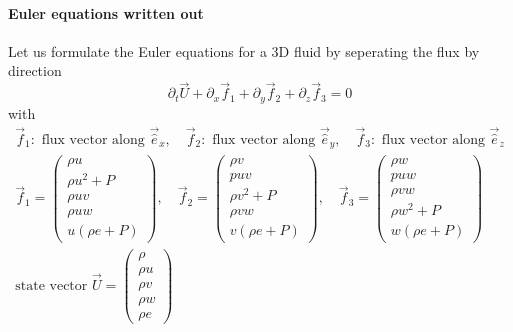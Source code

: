\paragraph*{Euler equations written out}
Let us formulate the \textcolor{blue1}{Euler equations for a 3D fluid} by seperating the flux by direction
\begin{equation}
    \partial_t \vec{U} + \partial_x \vec{f}_1 + \partial_y \vec{f}_2 + \partial_z \vec{f}_3 = 0
\end{equation}
with
\begin{equation}
    \begin{gathered}
        \vec{f}_1: \text{ flux vector along } \vec{\hat{e}}_x, \quad \vec{f}_2: \text{ flux vector along } \vec{\hat{e}}_y, \quad \vec{f}_3: \text{ flux vector along } \vec{\hat{e}}_z \\
        \vec{f}_1=\left(\begin{array}{c}
            \rho u \\
            \rho u^2+P \\
            \rho u v \\
            \rho u w \\
            u(\rho e+P)
            \end{array}\right), \quad \vec{f}_2=\left(\begin{array}{c}
            \rho v \\
            p u v \\
            \rho v^2+P \\
            \rho v w \\
            v(\rho e+P)
            \end{array}\right), \quad \vec{f}_3 =\left(\begin{array}{c}
            \rho w \\
            p u w \\
            \rho v w \\
            \rho w^2+P \\
            w(\rho e+P)
            \end{array}\right) \\
        \text{state vector } \vec{U} = \left(\begin{array}{c}
            \rho \\
            \rho u \\
            \rho v \\
            \rho w \\
            \rho e
            \end{array}\right)
    \end{gathered}
\end{equation}

